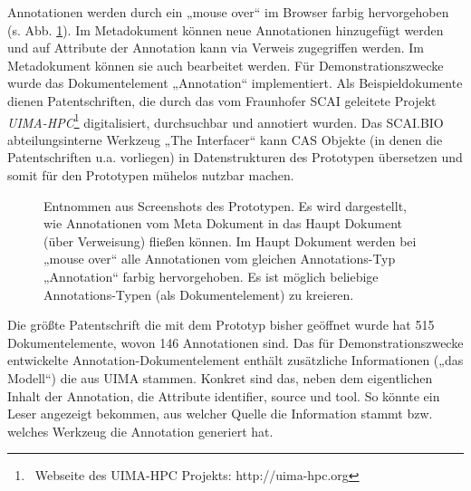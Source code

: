  
Annotationen werden durch ein „mouse over“ im Browser farbig hervorgehoben (s. Abb. \ref{annotation}). Im Metadokument können neue Annotationen hinzugefügt werden und auf Attribute der Annotation kann via Verweis zugegriffen werden. Im Metadokument können sie auch bearbeitet werden. Für Demonstrationszwecke wurde das Dokumentelement „Annotation“ implementiert. Als Beispieldokumente dienen Patentschriften, die durch das vom Fraunhofer SCAI geleitete Projekt \emph{UIMA-HPC}\footnote{~Webseite des UIMA-HPC Projekts: http://uima-hpc.org} digitalisiert, durchsuchbar und annotiert wurden. Das SCAI.BIO abteilungsinterne Werkzeug „The Interfacer“ kann CAS Objekte (in denen die Patentschriften u.a. vorliegen) in Datenstrukturen des Prototypen übersetzen und somit für den Prototypen mühelos nutzbar machen.

 
\begin{figure}[h!]
\centering
\advance\leftskip-2.5cm
\caption[Hauptdokument und Metadokument]{ Entnommen aus Screenshots des Prototypen. Es wird dargestellt, wie Annotationen vom Meta Dokument in das Haupt Dokument (über Verweisung) fließen können. Im Haupt Dokument werden bei „mouse over“ alle Annotationen vom gleichen Annotations-Typ „Annotation“ farbig hervorgehoben. Es ist möglich beliebige Annotations-Typen (als Dokumentelement) zu kreieren. }\label{annotation}
\end{figure}
 
Die größte Patentschrift die mit dem Prototyp bisher geöffnet wurde hat 515 Dokumentelemente, wovon 146 Annotationen sind. Das für Demonstrationszwecke entwickelte Annotation-Dokumentelement enthält zusätzliche Informationen („das Modell“) die aus UIMA stammen. Konkret sind das, neben dem eigentlichen Inhalt der Annotation, die Attribute identifier, source und tool. So könnte ein Leser angezeigt bekommen, aus welcher Quelle die Information stammt bzw. welches Werkzeug die Annotation generiert hat.

